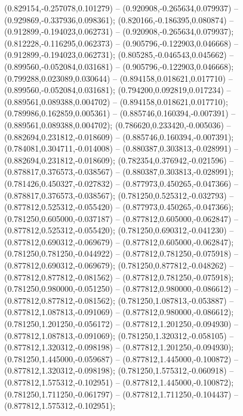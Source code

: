  (0.829154,-0.257078,0.101279) -- (0.920908,-0.265634,0.079937) -- (0.929869,-0.337936,0.098361);
 (0.820166,-0.186395,0.080874) -- (0.912899,-0.194023,0.062731) -- (0.920908,-0.265634,0.079937);
 (0.812228,-0.116295,0.062373) -- (0.905796,-0.122903,0.046668) -- (0.912899,-0.194023,0.062731);
 (0.805285,-0.046543,0.045662) -- (0.899560,-0.052084,0.031681) -- (0.905796,-0.122903,0.046668);
 (0.799288,0.023089,0.030644) -- (0.894158,0.018621,0.017710) -- (0.899560,-0.052084,0.031681);
 (0.794200,0.092819,0.017234) -- (0.889561,0.089388,0.004702) -- (0.894158,0.018621,0.017710);
 (0.789986,0.162859,0.005361) -- (0.885746,0.160394,-0.007391) -- (0.889561,0.089388,0.004702);
 (0.786620,0.233420,-0.005036) -- (0.882694,0.231812,-0.018609) -- (0.885746,0.160394,-0.007391);
 (0.784081,0.304711,-0.014008) -- (0.880387,0.303813,-0.028991) -- (0.882694,0.231812,-0.018609);
 (0.782354,0.376942,-0.021596) -- (0.878817,0.376573,-0.038567) -- (0.880387,0.303813,-0.028991);
 (0.781426,0.450327,-0.027832) -- (0.877973,0.450265,-0.047366) -- (0.878817,0.376573,-0.038567);
 (0.781250,0.525312,-0.032793) -- (0.877812,0.525312,-0.055420) -- (0.877973,0.450265,-0.047366);
 (0.781250,0.605000,-0.037187) -- (0.877812,0.605000,-0.062847) -- (0.877812,0.525312,-0.055420);
 (0.781250,0.690312,-0.041230) -- (0.877812,0.690312,-0.069679) -- (0.877812,0.605000,-0.062847);
 (0.781250,0.781250,-0.044922) -- (0.877812,0.781250,-0.075918) -- (0.877812,0.690312,-0.069679);
 (0.781250,0.877812,-0.048262) -- (0.877812,0.877812,-0.081562) -- (0.877812,0.781250,-0.075918);
 (0.781250,0.980000,-0.051250) -- (0.877812,0.980000,-0.086612) -- (0.877812,0.877812,-0.081562);
 (0.781250,1.087813,-0.053887) -- (0.877812,1.087813,-0.091069) -- (0.877812,0.980000,-0.086612);
 (0.781250,1.201250,-0.056172) -- (0.877812,1.201250,-0.094930) -- (0.877812,1.087813,-0.091069);
 (0.781250,1.320312,-0.058105) -- (0.877812,1.320312,-0.098198) -- (0.877812,1.201250,-0.094930);
 (0.781250,1.445000,-0.059687) -- (0.877812,1.445000,-0.100872) -- (0.877812,1.320312,-0.098198);
 (0.781250,1.575312,-0.060918) -- (0.877812,1.575312,-0.102951) -- (0.877812,1.445000,-0.100872);
 (0.781250,1.711250,-0.061797) -- (0.877812,1.711250,-0.104437) -- (0.877812,1.575312,-0.102951);
